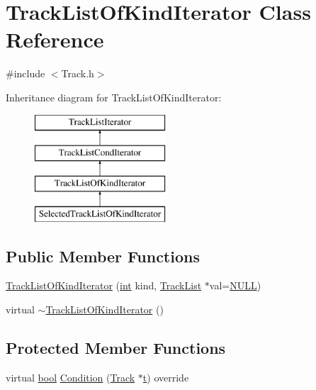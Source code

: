\hypertarget{class_track_list_of_kind_iterator}{}\section{Track\+List\+Of\+Kind\+Iterator Class Reference}
\label{class_track_list_of_kind_iterator}


{\ttfamily \#include $<$Track.\+h$>$}

Inheritance diagram for Track\+List\+Of\+Kind\+Iterator\+:\begin{figure}[H]
\begin{center}
\leavevmode
\includegraphics[height=4.000000cm]{class_track_list_of_kind_iterator}
\end{center}
\end{figure}
\subsection*{Public Member Functions}
\begin{DoxyCompactItemize}
\item 
\hyperlink{class_track_list_of_kind_iterator_ac507219655f0b11df5a5706d282d732e}{Track\+List\+Of\+Kind\+Iterator} (\hyperlink{xmltok_8h_a5a0d4a5641ce434f1d23533f2b2e6653}{int} kind, \hyperlink{class_track_list}{Track\+List} $\ast$val=\hyperlink{px__mixer_8h_a070d2ce7b6bb7e5c05602aa8c308d0c4}{N\+U\+LL})
\item 
virtual \hyperlink{class_track_list_of_kind_iterator_a3915bdd25c8afccb78d5c1aae399b17b}{$\sim$\+Track\+List\+Of\+Kind\+Iterator} ()
\end{DoxyCompactItemize}
\subsection*{Protected Member Functions}
\begin{DoxyCompactItemize}
\item 
virtual \hyperlink{mac_2config_2i386_2lib-src_2libsoxr_2soxr-config_8h_abb452686968e48b67397da5f97445f5b}{bool} \hyperlink{class_track_list_of_kind_iterator_a492ca22360cbf4b245046b997ae852be}{Condition} (\hyperlink{class_track}{Track} $\ast$\hyperlink{octave__test_8m_aaccc9105df5383111407fd5b41255e23}{t}) override
\end{DoxyCompactItemize}
